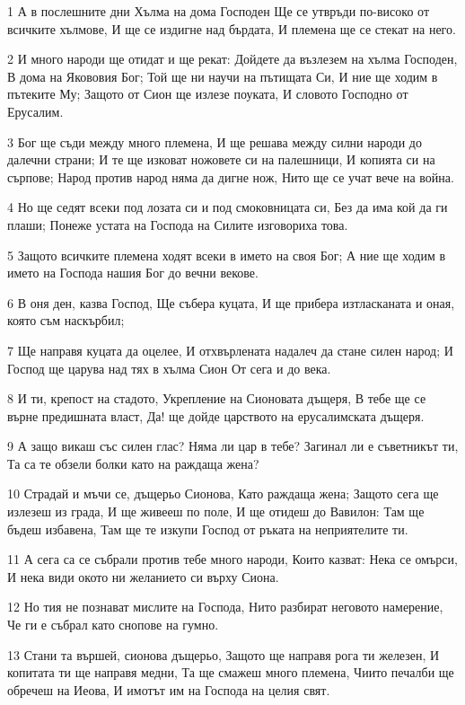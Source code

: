 \par 1 А в послешните дни Хълма на дома Господен Ще се утвръди по-високо от всичките хълмове, И ще се издигне над бърдата, И племена ще се стекат на него.
\par 2 И много народи ще отидат и ще рекат: Дойдете да възлезем на хълма Господен, В дома на Якововия Бог; Той ще ни научи на пътищата Си, И ние ще ходим в пътеките Му; Защото от Сион ще излезе поуката, И словото Господно от Ерусалим.
\par 3 Бог ще съди между много племена, И ще решава между силни народи до далечни страни; И те ще изковат ножовете си на палешници, И копията си на сърпове; Народ против народ няма да дигне нож, Нито ще се учат вече на война.
\par 4 Но ще седят всеки под лозата си и под смоковницата си, Без да има кой да ги плаши; Понеже устата на Господа на Силите изговориха това.
\par 5 Защото всичките племена ходят всеки в името на своя Бог; А ние ще ходим в името на Господа нашия Бог до вечни векове.
\par 6 В оня ден, казва Господ, Ще събера куцата, И ще прибера изтласканата и оная, която съм наскърбил;
\par 7 Ще направя куцата да оцелее, И отхвърлената надалеч да стане силен народ; И Господ ще царува над тях в хълма Сион От сега и до века.
\par 8 И ти, крепост на стадото, Укрепление на Сионовата дъщеря, В тебе ще се върне предишната власт, Да! ще дойде царството на ерусалимската дъщеря.
\par 9 А защо викаш със силен глас? Няма ли цар в тебе? Загинал ли е съветникът ти, Та са те обзели болки като на раждаща жена?
\par 10 Страдай и мъчи се, дъщерьо Сионова, Като раждаща жена; Защото сега ще излезеш из града, И ще живееш по поле, И ще отидеш до Вавилон: Там ще бъдеш избавена, Там ще те изкупи Господ от ръката на неприятелите ти.
\par 11 А сега са се събрали против тебе много народи, Които казват: Нека се омърси, И нека види окото ни желанието си върху Сиона.
\par 12 Но тия не познават мислите на Господа, Нито разбират неговото намерение, Че ги е събрал като снопове на гумно.
\par 13 Стани та вършей, сионова дъщерьо, Защото ще направя рога ти железен, И копитата ти ще направя медни, Та ще смажеш много племена, Чиито печалби ще обречеш на Иеова, И имотът им на Господа на целия свят.

